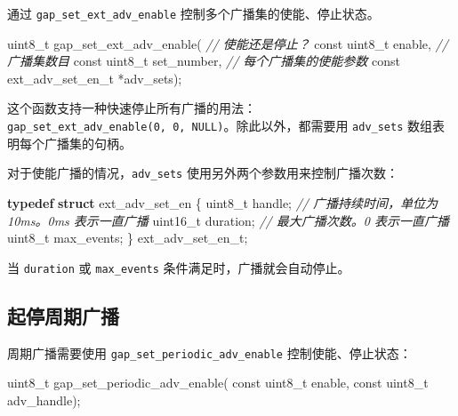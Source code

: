 \documentclass[
  12pt,
]{book}
\newenvironment{Shaded}{\begin{snugshade}}{\end{snugshade}}
\newcommand{\CommentTok}[1]{\textcolor[rgb]{0.56,0.35,0.01}{\textit{#1}}}
\newcommand{\DataTypeTok}[1]{\textcolor[rgb]{0.13,0.29,0.53}{#1}}
\newcommand{\KeywordTok}[1]{\textcolor[rgb]{0.13,0.29,0.53}{\textbf{#1}}}
\newcommand{\NormalTok}[1]{#1}
\begin{document}
通过 \texttt{gap\_set\_ext\_adv\_enable} 控制多个广播集的使能、停止状态。

\begin{Shaded}
\begin{Highlighting}[]
\DataTypeTok{uint8_t}\NormalTok{ gap_set_ext_adv_enable(}
  \CommentTok{// 使能还是停止？}
  \DataTypeTok{const} \DataTypeTok{uint8_t}\NormalTok{ enable,}
  \CommentTok{// 广播集数目}
  \DataTypeTok{const} \DataTypeTok{uint8_t}\NormalTok{ set_number,}
  \CommentTok{// 每个广播集的使能参数}
  \DataTypeTok{const}\NormalTok{ ext_adv_set_en_t *adv_sets);}
\end{Highlighting}
\end{Shaded}

这个函数支持一种快速停止所有广播的用法：\texttt{gap\_set\_ext\_adv\_enable(0,\ 0,\ NULL)}。除此以外，都需要用 \texttt{adv\_sets}
数组表明每个广播集的句柄。

对于使能广播的情况，\texttt{adv\_sets} 使用另外两个参数用来控制广播次数：

\begin{Shaded}
\begin{Highlighting}[]
\KeywordTok{typedef} \KeywordTok{struct}\NormalTok{ ext_adv_set_en}
\NormalTok{\{}
    \DataTypeTok{uint8_t}\NormalTok{ handle;}
    \CommentTok{// 广播持续时间，单位为 10ms。0ms 表示一直广播}
    \DataTypeTok{uint16_t}\NormalTok{ duration;}
    \CommentTok{// 最大广播次数。0 表示一直广播}
    \DataTypeTok{uint8_t}\NormalTok{ max_events;}
\NormalTok{\} ext_adv_set_en_t;}
\end{Highlighting}
\end{Shaded}

当 \texttt{duration} 或 \texttt{max\_events} 条件满足时，广播就会自动停止。

\hypertarget{ux8d77ux505cux5468ux671fux5e7fux64ad}{%
\subsection{起停周期广播}\label{ux8d77ux505cux5468ux671fux5e7fux64ad}}

周期广播需要使用 \texttt{gap\_set\_periodic\_adv\_enable} 控制使能、停止状态：

\begin{Shaded}
\begin{Highlighting}[]
\DataTypeTok{uint8_t}\NormalTok{ gap_set_periodic_adv_enable(}
  \DataTypeTok{const} \DataTypeTok{uint8_t}\NormalTok{ enable,}
  \DataTypeTok{const} \DataTypeTok{uint8_t}\NormalTok{ adv_handle);}
\end{Highlighting}
\end{Shaded}
\end{document}
